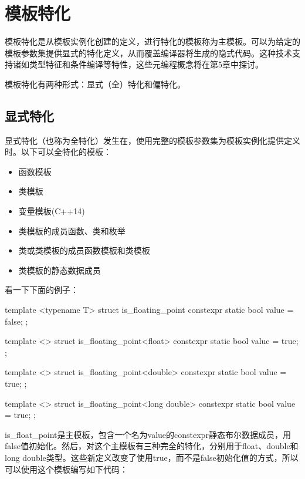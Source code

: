 \section{模板特化}

模板特化是从模板实例化创建的定义，进行特化的模板称为主模板。可以为给定的模板参数集提供显式的特化定义，从而覆盖编译器将生成的隐式代码。这种技术支持诸如类型特征和条件编译等特性，这些元编程概念将在第5章中探讨。

模板特化有两种形式：显式（全）特化和偏特化。

\subsection{显式特化}

显式特化（也称为全特化）发生在，使用完整的模板参数集为模板实例化提供定义时。以下可以全特化的模板：

\begin{itemize}
\item 
函数模板

\item 
类模板

\item 
变量模板(C++14)

\item 
类模板的成员函数、类和枚举

\item 
类或类模板的成员函数模板和类模板

\item 
类模板的静态数据成员
\end{itemize}

看一下下面的例子：

\begin{cpp}
template <typename T>
struct is_floating_point
{
	constexpr static bool value = false;
};

template <>
struct is_floating_point<float>
{
	constexpr static bool value = true;
};

template <>
struct is_floating_point<double>
{
	constexpr static bool value = true;
};

template <>
struct is_floating_point<long double>
{
	constexpr static bool value = true;
};
\end{cpp}

is\_float\_point是主模板，包含一个名为value的constexpr静态布尔数据成员，用false值初始化。然后，对这个主模板有三种完全的特化，分别用于float、double和long double类型。这些新定义改变了使用true，而不是false初始化值的方式，所以可以使用这个模板编写如下代码：

